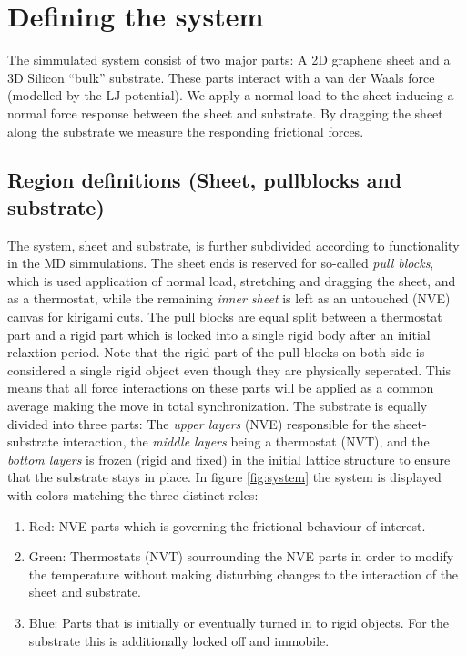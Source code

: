 \section{Defining the system}

The simmulated system consist of two major parts: A 2D graphene sheet and a 3D Silicon ``bulk'' substrate. These parts interact with a van der Waals force (modelled by the LJ potential). We apply a normal load to the sheet inducing a normal force response between the sheet and substrate. By dragging the sheet along the substrate we measure the responding frictional forces.


\subsection{Region definitions (Sheet, pullblocks and substrate)}

The system, sheet and substrate, is further subdivided according to
functionality in the MD simmulations. The sheet ends is reserved for so-called
\textit{pull blocks}, which is used application of normal load, stretching and
dragging the sheet, and as a thermostat, while the remaining \textit{inner
sheet} is left as an untouched (NVE) canvas for kirigami cuts. The pull blocks
are equal split between a thermostat part and a rigid part which is locked into
a single rigid body after an initial relaxtion period. Note that the rigid part
of the pull blocks on both side is considered a single rigid object even though
they are physically seperated. This means that all force interactions on these
parts will be applied as a common average making the move in total
synchronization. The substrate is equally divided into three parts: The
\textit{upper layers} (NVE) responsible for the sheet-substrate interaction, the
\textit{middle layers} being a thermostat (NVT), and the \textit{bottom layers}
is frozen (rigid and fixed) in the initial lattice structure to ensure that the
substrate stays in place. In figure \ref{fig:system} the system is displayed
with colors matching the three distinct roles:
\begin{enumerate}
  \item Red: NVE parts which is governing the frictional behaviour of interest.
  \item Green: Thermostats (NVT) sourrounding the NVE parts in order to modify the temperature without making disturbing changes to the interaction of the sheet and substrate.
  \item Blue: Parts that is initially or eventually turned in to rigid objects. For the substrate this is additionally locked off and immobile. 
\end{enumerate}

